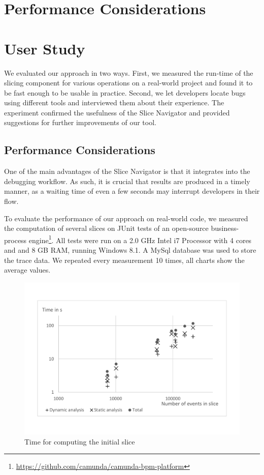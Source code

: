 \section{Performance Considerations}
\label{sec:eval}

\section{User Study}

\tmpStart
We evaluated our approach in two ways.
First, we measured the run-time of the slicing component for various operations on a real-world project and found it to be fast enough to be usable in practice.
Second, we let developers locate bugs using different tools and interviewed them about their experience.
The experiment confirmed the usefulness of the Slice Navigator and provided suggestions for further improvements of our tool.

\subsection{Performance Considerations}

One of the main advantages of the Slice Navigator is that it integrates into the debugging workflow.
As such, it is crucial that results are produced in a timely manner, as a waiting time of even a few seconds may interrupt developers in their flow.

To evaluate the performance of our approach on real-world code, we measured the computation of several slices on JUnit tests of an open-source business-process engine\footnote{\url{https://github.com/camunda/camunda-bpm-platform}}.
All tests were run on a 2.0 GHz Intel i7 Processor with 4 cores and and 8 GB RAM, running Windows 8.1.
A MySql database was used to store the trace data.
We repeated every measurement 10 times, all charts show the average values.

\begin{figure}
	\centering
		\includegraphics[width=\linewidth, clip, trim={20mm 26mm 20mm 26mm}]{img/chart-initial.pdf}
	\caption{Time for computing the initial slice}
	\label{fig:chartinitial}
\end{figure}

